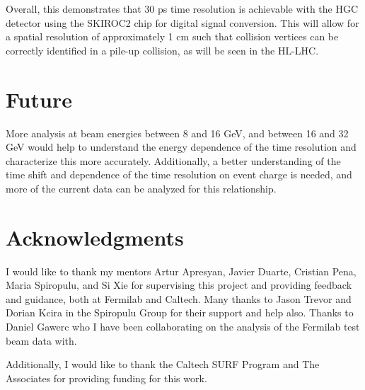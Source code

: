 \documentclass[twocolumn,aps,prd,reprint]{revtex4-1}
\begin{document}
Overall, this demonstrates that 30 ps time resolution is achievable with the HGC detector using the SKIROC2 chip for digital signal conversion. This will allow for a spatial resolution of approximately 1 cm such that collision vertices can be correctly identified in a pile-up collision, as will be seen in the HL-LHC.

\section{Future}

More analysis at beam energies between 8 and 16 GeV, and between 16 and 32 GeV would help to understand the energy dependence of the time resolution and characterize this more accurately. Additionally, a better understanding of the time shift and dependence of the time resolution on event charge is needed, and more of the current data can be analyzed for this relationship.

\section{Acknowledgments}

I would like to thank my mentors Artur Apresyan, Javier Duarte, Cristian Pena, Maria Spiropulu, and Si Xie for supervising this project and providing feedback and guidance, both at Fermilab and Caltech. Many thanks to Jason Trevor and Dorian Kcira in the Spiropulu Group for their support and help also. Thanks to Daniel Gawerc who I have been collaborating on the analysis of the Fermilab test beam data with.

Additionally, I would like to thank the Caltech SURF Program and The Associates for providing funding for this work.

\newpage

\nocite{*}

 
 
\end{document}
